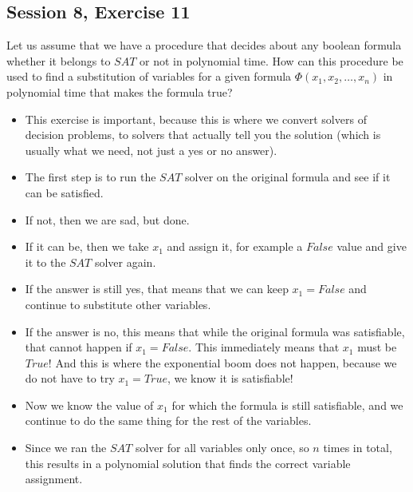 \subsection {Session 8, Exercise 11}
\label{8f11}


Let us assume that we have a procedure that decides about any boolean formula whether it belongs to $SAT$
or not in polynomial time. How can this procedure be used to find a substitution of variables for a given
formula $\Phi(x_1,x_2, \dots{},x_n)$ in polynomial time that makes the formula true?


\begin{itemize}
    \item This exercise is important, because this is where we convert solvers of decision problems, to solvers that actually tell you the solution (which is usually what we need, not just a yes or no answer).
    \item The first step is to run the $SAT$ solver on the original formula and see if it can be satisfied.
    \item If not, then we are sad, but done.
    \item If it can be, then we take $x_1$ and assign it, for example a $False$ value and give it to the $SAT$ solver again.
    \item If the answer is still yes, that means that we can keep $x_1 = False$ and continue to substitute other variables.
    \item If the answer is no, this means that while the original formula was satisfiable, that cannot happen if $x_1 = False$. This immediately means that $x_1$ must be $True$! And this is where the exponential boom does not happen, because we do not have to try $x_1 = True$, we know it is satisfiable!
    \item Now we know the value of $x_1$ for which the formula is still satisfiable, and we continue to do the same thing for the rest of the variables.
    \item Since we ran the $SAT$ solver for all variables only once, so $n$ times in total, this results in a polynomial solution that finds the correct variable assignment.
\end{itemize}